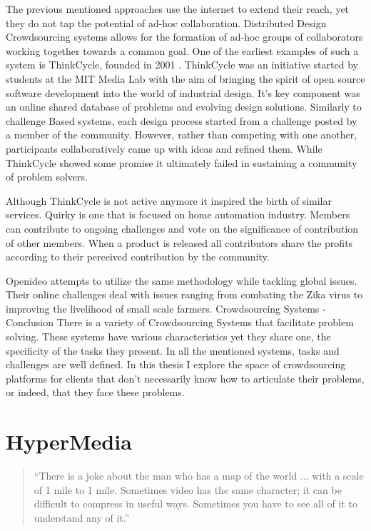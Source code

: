 The previous mentioned approaches use the internet to extend their reach, yet they do not tap the potential of ad-hoc collaboration. Distributed Design Crowdsourcing systems allows for the formation of ad-hoc groups of collaborators working together towards a common goal.  
One of the earliest examples of such a system is ThinkCycle, founded in 2001 \cite{sawhney2002thinkcycle}. ThinkCycle was an initiative started by students at the MIT Media Lab with the aim of bringing the spirit of open source software development into the world of industrial design. It’s key component was an online shared database of problems and evolving design solutions. Similarly to challenge Based systems, each design process started from a challenge posted by a member of the community. However, rather than competing with one another, participants collaboratively came up with ideas and refined them. While ThinkCycle showed some promise it ultimately failed in sustaining a community of problem solvers.

Although ThinkCycle is not active anymore it inspired the birth of similar services. Quirky\cite{quirky} is one that is focused on home automation industry. Members can contribute to ongoing challenges and vote on the significance of contribution of other members. When a product is released all contributors share the profits according to their perceived contribution by the community. 

Openideo\cite{openideo} attempts to utilize the same methodology while tackling global issues.  Their online challenges deal with issues ranging from combating the Zika virus to improving the livelihood of small scale farmers. 
Crowdsourcing Systems - Conclusion
There is a variety of Crowdsourcing Systems that facilitate problem solving. These systems have various characteristics yet they share one, the specificity of the tasks they present. In all the mentioned systems, tasks and challenges are well defined. In this thesis I explore the space of crowdsourcing platforms for clients that don’t necessarily know how to articulate their problems, or indeed, that they face these problems.

\section{HyperMedia}
\begin{quotation}
``There is a joke about the man who has a map of the world ... with a scale of 1 mile to 1 mile. Sometimes video has the same character; it can be difficult to compress in useful ways. Sometimes you have to see all of it to understand any of it.''  \cite{mackay1989eva}
\end{quotation}

